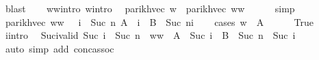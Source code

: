 \begin{isabellebody}
\ blast\isanewline
\ \ \isamarkupfalse%
\ w{}{\isacharunderscore}{\kern0pt}w{}{\isacharunderscore}{\kern0pt}intro\ w{}{\isacharprime}{\kern0pt}{\isacharunderscore}{\kern0pt}intro\ \isamarkupfalse%
\ {\isachardoublequoteopen}parikh{\isacharunderscore}{\kern0pt}vec\ w\ {\isacharequal}{\kern0pt}\ parikh{\isacharunderscore}{\kern0pt}vec\ {\isacharparenleft}{\kern0pt}w{}{\isacharat}{\kern0pt}w{}{\isacharprime}{\kern0pt}{\isacharparenright}{\kern0pt}{\isachardoublequoteclose}\isanewline
\ \ \ \ \isamarkupfalse%
\ simp\isanewline
\ \ \isamarkupfalse%
\ \isamarkupfalse%
\ {\isachardoublequoteopen}parikh{\isacharunderscore}{\kern0pt}vec\ {\isacharparenleft}{\kern0pt}w{}{\isacharat}{\kern0pt}w{}{\isacharprime}{\kern0pt}{\isacharparenright}{\kern0pt}\ {\isasymin}\ {\isasymPsi}\ {\isacharparenleft}{\kern0pt}{\isasymUnion}i\ {\isasymle}\ Suc\ n{\isachardot}{\kern0pt}\ A\ {\isacharcircum}{\kern0pt}{\isacharcircum}{\kern0pt}\ i\ {\isacharat}{\kern0pt}{\isacharat}{\kern0pt}\ B\ {\isacharcircum}{\kern0pt}{\isacharcircum}{\kern0pt}\ {\isacharparenleft}{\kern0pt}Suc\ n{\isacharminus}{\kern0pt}i{\isacharparenright}{\kern0pt}{\isacharparenright}{\kern0pt}{\isachardoublequoteclose}\isanewline
\ \ \isamarkupfalse%
\ {\isacharparenleft}{\kern0pt}cases\ {\isachardoublequoteopen}w{}\ {\isasymin}\ A{\isachardoublequoteclose}{\isacharparenright}{\kern0pt}\isanewline
\ \ \ \ \isamarkupfalse%
\ True\isanewline
\ \ \ \ \isamarkupfalse%
\ i{\isacharunderscore}{\kern0pt}intro\ \isamarkupfalse%
\ Suc{\isacharunderscore}{\kern0pt}i{\isacharunderscore}{\kern0pt}valid{\isacharcolon}{\kern0pt}\ {\isachardoublequoteopen}Suc\ i\ {\isasymle}\ Suc\ n{\isachardoublequoteclose}\ \ {\isachardoublequoteopen}w{}{\isacharat}{\kern0pt}w{}{\isacharprime}{\kern0pt}\ {\isasymin}\ A\ {\isacharcircum}{\kern0pt}{\isacharcircum}{\kern0pt}\ {\isacharparenleft}{\kern0pt}Suc\ i{\isacharparenright}{\kern0pt}\ {\isacharat}{\kern0pt}{\isacharat}{\kern0pt}\ B\ {\isacharcircum}{\kern0pt}{\isacharcircum}{\kern0pt}\ {\isacharparenleft}{\kern0pt}Suc\ n\ {\isacharminus}{\kern0pt}\ Suc\ i{\isacharparenright}{\kern0pt}{\isachardoublequoteclose}\isanewline
\ \ \ \ \ \ \isamarkupfalse%
\ {\isacharparenleft}{\kern0pt}auto\ simp\ add{\isacharcolon}{\kern0pt}\ conc{\isacharunderscore}{\kern0pt}assoc{\isacharparenright}{\kern0pt}\isanewline

\end{isabellebody}
